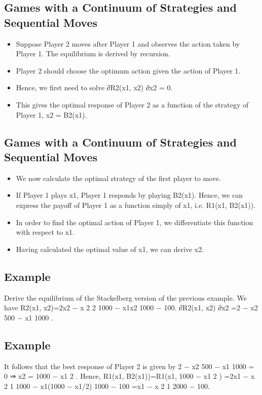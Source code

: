 \documentclass[]{report}
\begin{document}
\subsection{Games with a Continuum of Strategies and Sequential Moves}
\begin{itemize}
\item Suppose Player 2 moves after Player 1 and observes the action
taken by Player 1. The equilibrium is derived by recursion.
\item Player 2 should choose the optimum action given the action of
Player 1.
\item Hence, we first need to solve
∂R2(x1, x2)
∂x2
= 0.
\item This gives the optimal response of Player 2 as a function of the
strategy of Player 1, x2 = B2(x1).
\end{itemize}

\subsection{Games with a Continuum of Strategies and Sequential  Moves}

\begin{itemize}
	\item We now calculate the optimal strategy of the first player to move.
	\item If Player 1 plays x1, Player 1 responds by playing B2(x1). Hence,
	we can express the payoff of Player 1 as a function simply of x1,
	i.e. R1(x1, B2(x1)).
	\item 	In order to find the optimal action of Player 1, we differentiate this
	function with respect to x1.
	\item 	Having calculated the optimal value of x1, we can derive x2.
\end{itemize}

\subsection{Example}
Derive the equilibrium of the Stackelberg version of the previous
example.
We have
R2(x1, x2)=2x2 −
x
2
2
1000
−
x1x2
1000
− 100.
∂R2(x1, x2)
∂x2
=2 −
x2
500
−
x1
1000
.
\subsection{Example}
It follows that the best response of Player 2 is given by
2 −
x2
500
−
x1
1000
= 0 ⇒ x2 = 1000 −
x1
2
.
Hence,
R1(x1, B2(x1))=R1(x1, 1000 −
x1
2
)
=2x1 −
x
2
1
1000
−
x1(1000 − x1/2)
1000
− 100
=x1 −
x
2
1
2000
− 100.
\end{document}
